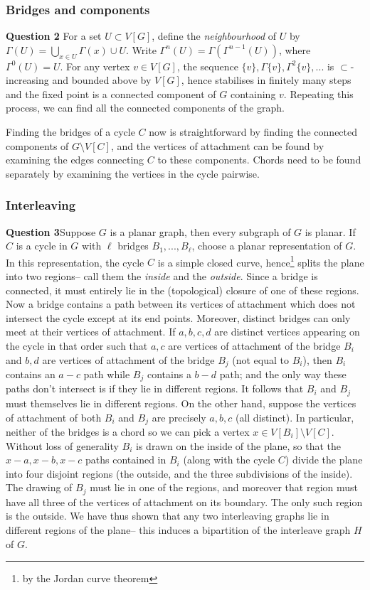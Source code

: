 \documentclass[12pt]{article}
\begin{document}
\subsubsection{Bridges and components}
\textbf{Question 2}\quad 
For a set \(U\subset V[G]\), define the \emph{neighbourhood} of \(U\) by  \(\Gamma(U)=\bigcup_{x\in U}\Gamma(x) \cup U\). Write \(\Gamma^n(U)=\Gamma(\Gamma^{n-1}(U))\), where \(\Gamma^0(U)=U\). For any vertex \(v\in V[G]\), the sequence \(\{v\},
\Gamma\{v\}, \Gamma^2\{v\},...\) is \(\subset\)-increasing and bounded
above by \(V[G]\), hence stabilises in finitely many steps and the fixed point
is a connected component of \(G\) containing \(v\). Repeating this
process, we can find all the connected components of the graph.

Finding the bridges of a cycle \(C\) now is straightforward by finding the connected
components of \(G\setminus V[C]\), and the vertices of attachment can be found
by examining the edges connecting \(C\) to these components. Chords need to be
found separately by examining the vertices in the cycle pairwise.

\subsubsection{Interleaving}
\textbf{Question 3}\quad Suppose \(G\) is a planar graph, then every subgraph of
\(G\) is planar. If \(C\) is a cycle in \(G\) with \(\ell\) bridges
\(B_1,...,B_\ell\), choose a planar representation of \(G\). In this
representation, the cycle \(C\) is a simple closed curve, hence\footnote{by the Jordan
curve theorem} splits the plane into two regions-- call them the \emph{inside}
and the \emph{outside}. Since a bridge is connected, it must entirely lie in the
(topological) closure of one of these regions. Now a bridge contains
a path between its vertices of attachment which does not intersect the cycle
except at its end points. Moreover, distinct bridges can only meet at their
vertices of attachment. If \(a,b,c,d\) are distinct vertices
appearing on the cycle in that order such that \(a,c\) are vertices of attachment
of the bridge \(B_i\) and \(b,d\) are vertices of attachment of the bridge \(B_j
\) (not equal to \(B_i\)), then \(B_i\) contains an \(a-c\) path while \(B_j\)
contains a \(b-d\) path; and the only way these paths don't intersect is if they
lie in different regions. It follows that \(B_i\) and \(B_j\) must themselves lie in different regions. On the other hand, suppose the vertices of attachment of both \(B_i\) and \(B_j\) are
precisely \(a,b,c\) (all distinct). In particular, neither of the bridges is a
chord so we can pick a vertex \(x\in V[B_i]\setminus V[C]\). Without loss of
generality \(B_i\) is drawn on the inside of the plane, so that the
\(x-a,x-b,x-c\) paths contained in \(B_i\) (along with the cycle \(C\)) divide
the plane into four disjoint regions (the outside, and the three subdivisions of
the inside). The drawing of \(B_j\) must lie in one of the regions, and moreover
that region must have all three of the vertices of attachment on its boundary.
The only such region is the outside. We have thus shown that any two
interleaving graphs lie in different regions of the plane-- this induces a
bipartition of the interleave graph \(H\) of \(G\).
\end{document}
